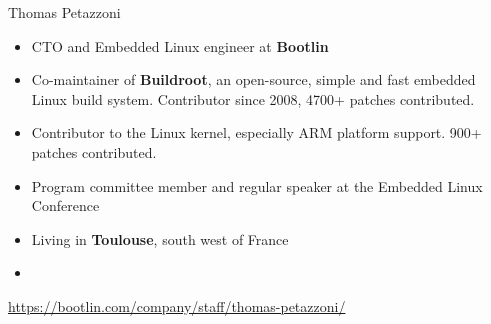 \begin{frame}{Thomas Petazzoni}
  \begin{itemize}
  \item CTO and Embedded Linux engineer at {\bf Bootlin}
  \item Co-maintainer of {\bf Buildroot}, an open-source, simple and
    fast embedded Linux build system. Contributor since 2008, 4700+
    patches contributed.
  \item Contributor to the Linux kernel, especially ARM platform
    support. 900+ patches contributed.
  \item Program committee member and regular speaker at the Embedded
    Linux Conference
  \item Living in {\bf Toulouse}, south west of France
  \item {}
  \end{itemize}
  {\small \url{https://bootlin.com/company/staff/thomas-petazzoni/}}
\end{frame}
